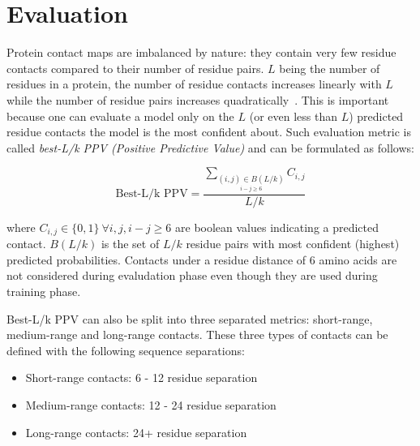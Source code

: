 \section{Evaluation} \label{evaluationmetrics}

    Protein contact maps are imbalanced by nature: they contain very few residue contacts compared to their number of residue pairs.
    $L$ being the number of residues in a protein, the number of residue contacts increases linearly with $L$ while the number of residue pairs
    increases quadratically~\cite{OLMEA1997S25}. This is important because one can evaluate a model only on the $L$ (or even less than $L$) predicted
    residue contacts the model is the most confident about. Such evaluation metric is called \textit{best-L/k PPV (Positive Predictive Value)}
    and can be formulated as follows:

    \begin{equation}
      \text{Best-L/k PPV} = \frac{\sum_{\underset {i-j \geq 6}{(i, j) \in B(L/k)}} C_{i, j}}{L/k}
    \end{equation}

    where $C_{i, j} \in \{0, 1\} \ \forall i, j, i-j \ge 6$ are boolean values indicating a predicted contact.
    $B(L/k)$ is the set of $L/k$ residue pairs with most confident (highest) predicted probabilities.
    Contacts under a residue distance of 6 amino acids are not considered during evaludation phase even though they are used during
    training phase.

    Best-L/k PPV can also be split into three separated metrics: short-range, medium-range and long-range contacts.
    These three types of contacts can be defined with the following sequence separations:

      \begin{itemize}
        \item Short-range contacts: 6 - 12 residue separation
        \item Medium-range contacts: 12 - 24 residue separation
        \item Long-range contacts: 24+ residue separation
      \end{itemize}
